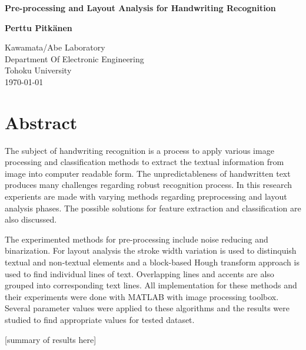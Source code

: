 \documentclass{article}
\begin{document}
   \begin{titlepage}
     \begin{center}
       \vspace*{1cm}

        \huge
        \textbf{Pre-processing and Layout Analysis for Handwriting Recognition}

        \vspace{2cm}

        \textbf{Perttu Pitk{\"a}nen}

        \vfill
        \Large
        Kawamata/Abe Laboratory\\
        Department Of Electronic Engineering\\
        Tohoku University\\
        \today
     \end{center}
   \end{titlepage}

   \newpage
   \section*{Abstract}
    The subject of handwriting recognition is a process to apply various image processing and classification methods to extract the textual information from image into computer readable form. The unpredictableness of handwritten text produces many challenges regarding robust recognition process. In this research experients are made with varying methods regarding preprocessing and layout analysis phases. The possible solutions for feature extraction and classification are also discussed.

    The experimented methods for pre-processing include noise reducing and binarization. For layout analysis the stroke width variation is used to distinquish textual and non-textual elements and a block-based Hough transform approach is used to find individual lines of text. Overlapping lines and accents are also grouped into corresponding text lines. All implementation for these methods and their experiments were done with MATLAB with image processing toolbox. Several parameter values were applied to these algorithms and the results were studied to find appropriate values for tested dataset.

    [summary of results here]

   \newpage
   \tableofcontents

   \newpage
\end{document}
